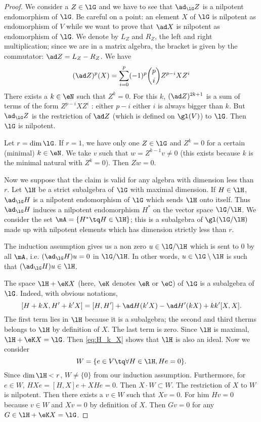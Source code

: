 \begin{proof}
 We consider a $Z\in\lG$ and we have to see that $\ad_{\lG}Z$ is a nilpotent endomorphism of $\lG$. Be careful on a point: an element $X$ of $\lG$ is nilpotent as endomorphism of $V$ while we want to prove that $\ad X$ is nilpotent as endomorphism of $\lG$. We denote by $L_Z$ and $R_Z$, the left and right multiplication; since we are in a matrix algebra, the bracket is given by the commutator: $\ad Z=L_Z-R_Z$. We have
\begin{equation}
(\ad Z)^p(X)=\sum_{i=0}^p(-1)^p \binom{p}{i}  Z^{p-i}XZ^i
\end{equation}
There exists a $k\in\eN$ such that $Z^k=0$. For this $k$, $(\ad Z)^{2k+1}$ is a sum of terms of the form $Z^{p-i}XZ^i$ : either $p-i$ either $i$ is always bigger than $k$. But $\ad_{\lG}Z$ is the restriction of $\ad Z$ (which is defined on $\gl(V)$) to $\lG$. Then $\lG$ is nilpotent.

 Let $r=\dim\lG$. If $r=1$, we have only one $Z\in\lG$ and $Z^k=0$ for a certain (minimal) $k\in\eN$. We take $v$ such that $w=Z^{k-1}v\neq 0$ (this exists because $k$ is the minimal natural with $Z^k=0$). Then $Zw=0$.

Now we suppose that the claim is valid for any algebra with dimension less than $r$. Let $\lH$ be a strict subalgebra of $\lG$ with maximal dimension. If $H\in\lH$, $\ad_{\lG}H$ is a nilpotent endomorphism of $\lG$ which sends $\lH$ onto itself. Thus $\ad_{\lG}H$ induces a nilpotent endomorphism $H^*$ on the vector space $\lG/\lH$. We consider the set $\mA=\{H^*\tq H\in\lH\}$; this is a subalgebra of $\gl(\lG/\lH)$ made up with nilpotent elements which has dimension strictly less than $r$.

The induction assumption gives us a non zero $u\in \lG/\lH$ which is sent to $0$ by all $\mA$, i.e. $(\ad_{\lG}H)u=0$ in $\lG/\lH$. In other words, $u\in\lG\setminus\lH$ is such that $(\ad_{\lG}H)u\in\lH$.

The space $\lH+\eK X$ (here, $\eK$ denotes $\eR$ or $\eC$) of $\lG$ is a subalgebra of $\lG$. Indeed, with obvious notations,
\begin{equation}\label{eq:H_k_X}
[H+kX,H'+k'X]=[H,H']+\ad H(k'X)-\ad H'(kX)+kk'[X,X].
\end{equation}
The first term lies in $\lH$ because it is a subalgebra; the second and third therms belongs to $\lH$ by definition of $X$. The last term is zero. Since $\lH$ is maximal, $\lH+\eK X=\lG$. Then \eqref{eq:H_k_X} shows that $\lH$ is also an ideal. Now we consider
\[
  W=\{e\in V\tq\forall H\in\lH, He=0\}.
\]
Since $\dim\lH< r$, $W\neq\{0\}$ from our induction assumption. Furthermore, for $e\in W$, $HXe=[H,X]e+XHe=0$. Then $X\cdot W\subset W$. The restriction of $X$ to $W$ is nilpotent. Then there exists a $v\in W$ such that $Xv=0$. For him $Hv=0$ because $v\in W$ and $Xv=0$ by definition of $X$. Then $Gv=0$ for any $G\in\lH+\eK X=\lG$.


\end{proof}
